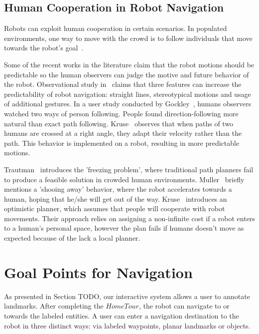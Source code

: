\documentclass[12pt]{gatech-thesis}
\begin{document}
\subsection{Human Cooperation in Robot Navigation}

Robots can exploit human cooperation in certain scenarios. In populated environments, one way to move with the crowd is to follow individuals that move towards the robot's goal~\cite{stein2012robot,muller2008socially}. 

Some of the recent works in the literature claim that the robot motions should be predictable so the human observers can judge the motive and future behavior of the robot. Observational study in~\cite{lichtenthaler2013towards} claims that three features can increase the predictability of robot navigation: straight lines, stereotypical motions and usage of additional gestures. In a user study conducted by Gockley~\cite{gockley2007natural}, humans observers watched two ways of person following. People found direction-following more natural than exact path following. Kruse~\cite{kruse2012legible} observes that when paths of two humans are crossed at a right angle, they adapt their velocity rather than the path. This behavior is implemented on a robot, resulting in more predictable motions. 

Trautman~\cite{trautman2010unfreezing} introduces the 'freezing problem', where traditional path planners fail to produce a feasible solution in crowded human environments. Muller~\cite{muller2008socially} briefly mentions a 'shooing away' behavior, where the robot accelerates towards a human, hoping that he/she will get out of the way. Kruse~\cite{kruse2010exploiting} introduces an optimistic planner, which assumes that people will cooperate with robot movements. Their approach relies on assigning a non-infinite cost if a robot enters to a human's personal space, however the plan fails if humans doesn't move as expected because of the lack a local planner.


\section{Goal Points for Navigation}
\label{sec:navigation_finding_goal_points_for_navigation}

As presented in Section TODO, our interactive system allows a user to annotate landmarks. After completing the $Home Tour$, the robot can navigate to or towards the labeled entities.
A user can enter a navigation destination to the robot in three distinct ways: via labeled waypoints, planar landmarks or objects.
\end{document}
